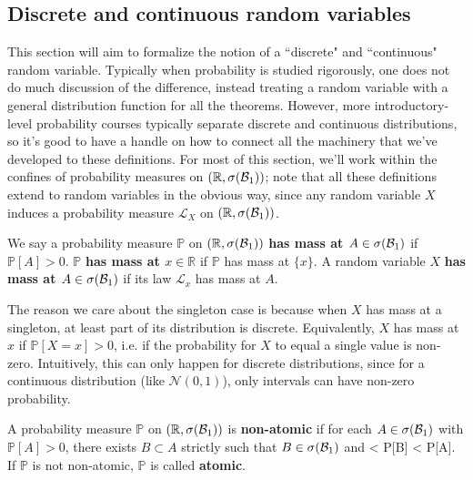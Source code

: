 \subsection{Discrete and continuous random variables}
\label{subsec:dist_types}

This section will aim to formalize the notion of a ``discrete" and ``continuous" random variable. Typically when probability is studied rigorously, one does not do much discussion of the difference, instead treating a random variable with a general distribution function for all the theorems. However, more introductory-level probability courses typically separate discrete and continuous distributions, so it's good to have a handle on how to connect all the machinery that we've developed to these definitions. For most of this section, we'll work within the confines of probability measures on $(\mathbb R, \sigma(\mathcal{B}_{1}))$; note that all these definitions extend to random variables in the obvious way, since any random variable $X$ induces a probability measure $\mathcal L_X$ on $(\mathbb R, \sigma(\mathcal{B}_{1}))$. 

\begin{definition}[Mass]
	We say a probability measure $\mathbb P$ on $(\mathbb R, \sigma(\mathcal{B}_{1}))$ \textbf{has mass at $A\in\sigma(\mathcal{B}_{1})$} if $\mathbb P[A] > 0$. $\mathbb P$ \textbf{has mass at $x\in\mathbb R$} if $\mathbb P$ has mass at $\{x\}$. A random variable $X$ \textbf{has mass at $A\in\sigma(\mathcal{B}_{1})$} if its law $\mathcal L_x$ has mass at $A$. 
\end{definition}

The reason we care about the singleton case is because when $X$ has mass at a singleton, at least part of its distribution is discrete. Equivalently, $X$ has mass at $x$ if $\mathbb P[X = x] > 0$, i.e. if the probability for $X$ to equal a single value is non-zero. Intuitively, this can only happen for discrete distributions, since for a continuous distribution (like $\mathcal N(0, 1)$), only intervals can have non-zero probability. 

\begin{definition}
	A probability measure $\mathbb P$ on $(\mathbb R, \sigma(\mathcal{B}_{1}))$ is \textbf{non-atomic} if for each $A\in\sigma(\mathcal{B}_{1})$ with $\mathbb P[A] > 0$, there exists $B\subset A$ strictly such that $B\in\sigma(\mathcal{B}_{1})$ and
	 < \mathbb P[B] < \mathbb P[A].
	\qe
	If $\mathbb P$ is not non-atomic, $\mathbb P$ is called \textbf{atomic}. 
\end{definition}

